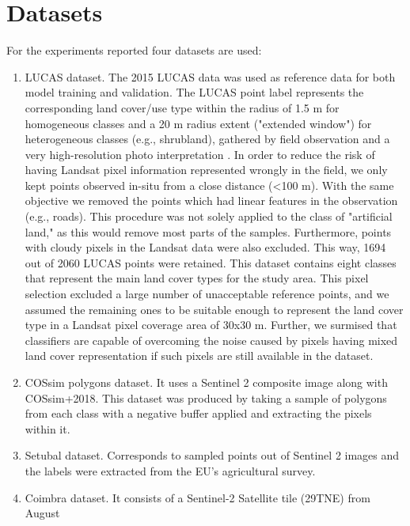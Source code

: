 \documentclass[12pt, english, openany]{book}
\begin{document}
\section{Datasets}

For the experiments reported four datasets are used:

\begin{enumerate}
  \item LUCAS dataset. The 2015 LUCAS data was used as reference data for both model
        training and validation. The LUCAS point label represents the corresponding
        land cover/use type within the radius of 1.5 m for homogeneous classes and a 20
        m radius extent ("extended window") for heterogeneous classes (e.g.,
        shrubland), gathered by field observation and a very high-resolution photo
        interpretation \cite{LUCAS2015C1}. In order to reduce the risk of having
        Landsat pixel information represented wrongly in the field, we only kept points
        observed in-situ from a close distance (<100 m). With the same objective we
        removed the points which had linear features in the observation (e.g., roads).
        This procedure was not solely applied to the class of "artificial land," as
        this would remove most parts of the samples. Furthermore, points with cloudy
        pixels in the Landsat data were also excluded. This way, 1694 out of 2060 LUCAS
        points were retained. This dataset contains eight classes that represent the
        main land cover types for the study area. This pixel selection excluded a large
        number of unacceptable reference points, and we assumed the remaining ones to
        be suitable enough to represent the land cover type in a Landsat pixel coverage
        area of 30x30 m. Further, we surmised that classifiers are capable of
        overcoming the noise caused by pixels having mixed land cover representation if
        such pixels are still available in the dataset.
  \item COSsim polygons dataset. It uses a Sentinel 2 composite image along with
        COSsim+2018. This dataset was produced by taking a sample of polygons from each
        class with a negative buffer applied and extracting the pixels within it.
  \item Setubal dataset. Corresponds to sampled points out of Sentinel 2 images and the
        labels were extracted from the EU's agricultural survey.
  \item Coimbra dataset. It consists of a Sentinel-2 Satellite tile (29TNE) from August

\end{enumerate}
\end{document}
